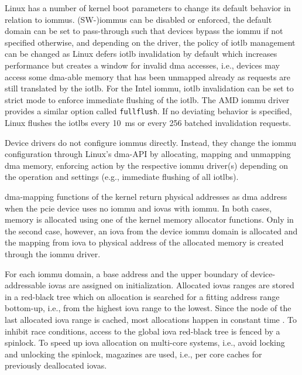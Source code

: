 Linux has a number of kernel boot parameters to change its default behavior in
relation to \acp{iommu}. (SW-)\acp{iommu} can be disabled or enforced, the
default domain can be set to pass-through such that devices bypass the
\ac{iommu} if not specified otherwise, and depending on the driver, the policy
of \ac{iotlb} management can be changed as Linux defers \ac{iotlb} invalidation
by default which increases performance but creates a window for invalid \ac{dma}
accesses, i.e., devices may access some \ac{dma}-able memory that has been
unmapped already as requests are still translated by the \ac{iotlb}. For the
Intel \ac{iommu}, \ac{iotlb} invalidation can be set to strict mode to enforce
immediate flushing of the \ac{iotlb}. The AMD \ac{iommu} driver provides a
similar option called \texttt{fullflush}. If no deviating behavior is specified,
Linux flushes the \acp{iotlb} every \SI{10}{\ms} or every 256 batched
invalidation requests.

Device drivers do not configure \acp{iommu} directly. Instead, they change the
\ac{iommu} configuration through Linux's \ac{dma}-API by allocating, mapping and
unmapping \ac{dma} memory, enforcing action by the respective \ac{iommu}
driver(s) depending on the operation and settings (e.g., immediate flushing of
all \acp{iotlb}).

\ac{dma}-mapping functions of the kernel return physical addresses as \ac{dma}
address when the \ac{pcie} device uses no \ac{iommu} and \acp{iova} with
\ac{iommu}. In both cases, memory is allocated using one of the kernel memory
allocator functions. Only in the second case, however, an \ac{iova} from the
device \ac{iommu} domain is allocated and the mapping from \ac{iova} to physical
address of the allocated memory is created through the \ac{iommu} driver.

For each \ac{iommu} domain, a base address and the upper boundary of
device-addressable \acp{iova} are assigned on initialization. Allocated
\acp{iova} ranges are stored in a red-black tree which on allocation is searched
for a fitting address range bottom-up, i.e., from the highest \ac{iova} range to
the lowest. Since the node of the last allocated \ac{iova} range is cached, most
allocations happen in constant time \cite{malka2015efficient}. To inhibit race
conditions, access to the global \ac{iova} red-black tree is fenced by a
spinlock. To speed up \ac{iova} allocation on multi-core systems, i.e., avoid
locking and unlocking the spinlock, magazines are used, i.e., per core caches
for previously deallocated \acp{iova}.

